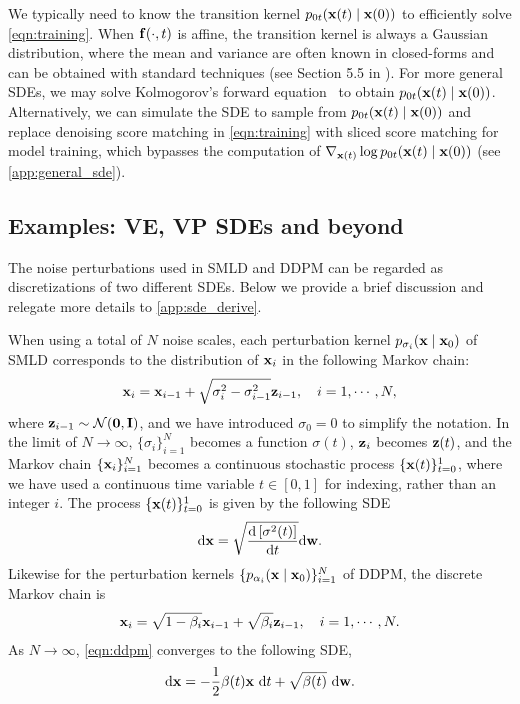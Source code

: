 We typically need to know the transition kernel $p_{0t}(\mathbf{x}(t) \mid \mathbf{x}(0))$ to efficiently solve \cref{eqn:training}. When $\mathbf{f}(\cdot, t)$ is affine, the transition kernel is always a Gaussian distribution, where the mean and variance are often known in closed-forms and can be obtained with standard techniques (see Section 5.5 in \citet{sarkka2019applied}). For more general SDEs, we may solve Kolmogorov's forward equation~\citep{oksendal2003stochastic} to obtain $p_{0t}(\mathbf{x}(t) \mid \mathbf{x}(0))$. Alternatively, we can simulate the SDE to sample from $p_{0t}(\mathbf{x}(t) \mid \mathbf{x}(0))$ and replace denoising score matching in \cref{eqn:training} with sliced score matching for model training, which bypasses the computation of $\nabla_{\mathbf{x}(t)} \log p_{0t}(\mathbf{x}(t) \mid \mathbf{x}(0))$ (see \cref{app:general_sde}).




\subsection{Examples: VE, VP SDEs and beyond}\label{sec:sde_examples}
The noise perturbations used in SMLD and DDPM can be regarded as discretizations of two different SDEs. %
Below we provide a brief discussion and relegate more details to \cref{app:sde_derive}.

When using a total of $N$ noise scales, each perturbation kernel $p_{\sigma_i}(\mathbf{x} \mid \mathbf{x}_0)$ of SMLD corresponds to the distribution of $\mathbf{x}_i$ in the following Markov chain:
\begin{align}
\mathbf{x}_i = \mathbf{x}_{i-1} + \sqrt{\sigma_{i}^2 - \sigma_{i-1}^2} \mathbf{z}_{i-1}, \quad i=1,\cdots,N \label{eqn:ncsn},
\end{align}
where $\mathbf{z}_{i-1} \sim \mathcal{N}(\mathbf{0}, \mathbf{I})$, and we have introduced $\sigma_0 = 0$ to simplify the notation.
In the limit of $N \to \infty$, $\{\sigma_i\}_{i=1}^N$ becomes a function $\sigma(t)$, $\mathbf{z}_i$ becomes $\mathbf{z}(t)$, and the Markov chain $\{\mathbf{x}_i\}_{i=1}^N$ becomes a continuous stochastic process $\{\mathbf{x}(t)\}_{t=0}^1$, where we have used a continuous time variable $t \in [0, 1]$ for indexing, rather than an integer $i$. The process $\{\mathbf{x}(t)\}_{t=0}^1$ is given by the following SDE
\begin{align}
\mathrm{d} \mathbf{x} = \sqrt{\frac{\mathrm{d} \left[ \sigma^2(t) \right]}{\mathrm{d} t}}\mathrm{d} \mathbf{w}. \label{eqn:ncsn_sde}
\end{align}
Likewise for the perturbation kernels $\{p_{\alpha_i}(\mathbf{x} \mid \mathbf{x}_0)\}_{i=1}^N$ of DDPM, the discrete Markov chain is
\begin{align}
    \mathbf{x}_i = \sqrt{1-\beta_{i}} \mathbf{x}_{i-1} + \sqrt{\beta_{i}} \mathbf{z}_{i-1}, \quad i=1,\cdots,N. \label{eqn:ddpm}
\end{align}
As $N\to \infty$, \cref{eqn:ddpm} converges to the following SDE,
\begin{align}
\mathrm{d} \mathbf{x} = -\frac{1}{2}\beta(t) \mathbf{x}~ \mathrm{d} t + \sqrt{\beta(t)} ~\mathrm{d} \mathbf{w}. \label{eqn:ddpm_sde}
\end{align}


